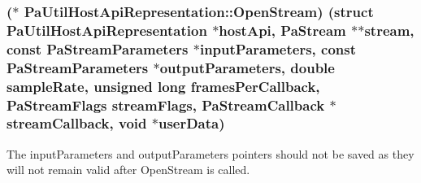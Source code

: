 \subsubsection[{\texorpdfstring{Open\+Stream}{OpenStream}}]{($\ast$ Pa\+Util\+Host\+Api\+Representation\+::\+Open\+Stream) (struct {\bf Pa\+Util\+Host\+Api\+Representation} $\ast$host\+Api, {\bf Pa\+Stream} $\ast$$\ast$stream, {\bf const} {\bf Pa\+Stream\+Parameters} $\ast$input\+Parameters, {\bf const} {\bf Pa\+Stream\+Parameters} $\ast$output\+Parameters, double sample\+Rate, unsigned long frames\+Per\+Callback, {\bf Pa\+Stream\+Flags} stream\+Flags, {\bf Pa\+Stream\+Callback} $\ast$stream\+Callback, {\bf void} $\ast${\bf user\+Data})}\hypertarget{struct_pa_util_host_api_representation_aa415b57fadf39a49d6bc5740f06089e4}{}\label{struct_pa_util_host_api_representation_aa415b57fadf39a49d6bc5740f06089e4}
The input\+Parameters and output\+Parameters pointers should not be saved as they will not remain valid after Open\+Stream is called.

